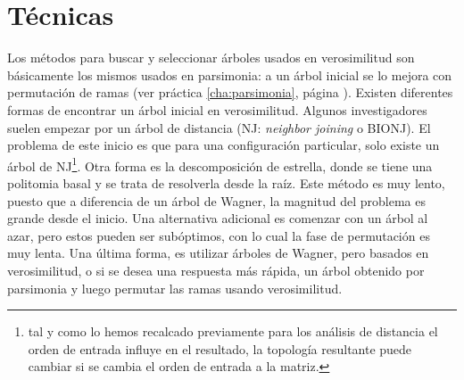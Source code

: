 \section*{T\'ecnicas} Los m\'etodos para buscar y seleccionar \'arboles 
usados en verosimilitud son b\'asicamente los mismos usados en 
parsimonia: a un \'arbol inicial se lo mejora con permutaci\'on de 
ramas (ver pr\'actica \ref{cha:parsimonia}, p\'agina 
\pageref{cha:parsimonia}). Existen diferentes formas de encontrar un 
\'arbol inicial en verosimilitud. Algunos investigadores suelen empezar 
por un \'arbol de distancia (NJ: {{\textit{neighbor joining}}} o 
BIONJ). El problema de este inicio es que para una configuraci\'on 
particular, solo existe un \'arbol de NJ\footnote{tal y como lo hemos 
recalcado previamente para los an\'alisis de distancia el orden de 
entrada influye en el resultado, la topolog\'ia resultante puede 
cambiar si se cambia el orden de entrada a la matriz.}. Otra forma es 
la descomposici\'on de estrella, donde se tiene una politomia basal y 
se trata de resolverla desde la ra\'iz. Este m\'etodo es muy lento, 
puesto que a diferencia de un \'arbol de Wagner, la magnitud del 
problema es grande desde el inicio. Una alternativa adicional es 
comenzar con un \'arbol al azar, pero estos pueden ser sub\'optimos, 
con lo cual la fase de permutaci\'on es muy lenta. Una \'ultima forma, 
es utilizar \'arboles de Wagner, pero basados en verosimilitud, o si se 
desea una respuesta m\'as r\'apida, un \'arbol obtenido por parsimonia 
y luego permutar las ramas usando verosimilitud.

